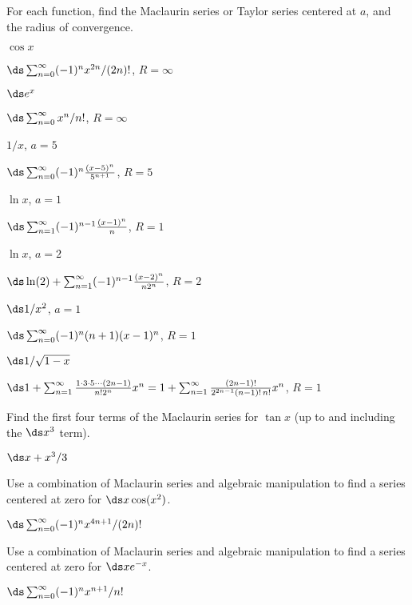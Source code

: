 \begin{exercises}

For each function, find the Maclaurin series or Taylor series centered
at $a$, and the radius of convergence.

\exercise $\cos x$
\begin{answer} $\ds\sum_{n=0}^\infty (-1)^n x^{2n}/(2n)!$, $R=\infty$
\end{answer}

\exercise $\ds e^x$
\begin{answer} $\ds\sum_{n=0}^\infty x^n/n!$, $R=\infty$
\end{answer}

\exercise $1/x$, $a=5$
\begin{answer} $\ds\sum_{n=0}^\infty (-1)^n{(x-5)^n\over 5^{n+1}}$, $R=5$
\end{answer}

\exercise $\ln x$, $a=1$
\begin{answer} $\ds\sum_{n=1}^\infty (-1)^{n-1}{(x-1)^n\over n}$, $R=1$
\end{answer}

\exercise $\ln x$, $a=2$
\begin{answer} $\ds\ln(2)+\sum_{n=1}^\infty (-1)^{n-1}{(x-2)^n\over n 2^n}$, $R=2$
\end{answer}

\exercise $\ds 1/x^2$, $a=1$
\begin{answer} $\ds\sum_{n=0}^\infty (-1)^n(n+1)(x-1)^n$, $R=1$
\end{answer}

\exercise $\ds 1/\sqrt{1-x}$
\begin{answer} $\ds1+\sum_{n=1}^\infty {1\cdot3\cdot5\cdots(2n-1)\over
n!2^n} x^n=1+\sum_{n=1}^\infty {(2n-1)!\over 2^{2n-1}(n-1)!\,n!}x^n$, $R=1$
\end{answer}

\exercise Find the first four terms of the Maclaurin series for $\tan
x$ (up to and including the $\ds x^3$ term).
\begin{answer} $\ds x+x^3/3$
\end{answer}

\exercise Use a combination of Maclaurin series and algebraic
manipulation to find a series centered at zero for
$\ds x\cos (x^2)$.
\begin{answer} $\ds\sum_{n=0}^\infty (-1)^n x^{4n+1}/(2n)!$
\end{answer}

\exercise Use a combination of Maclaurin series and algebraic
manipulation to find a series centered at zero for
$\ds xe^{-x}$.
\begin{answer} $\ds\sum_{n=0}^\infty (-1)^n x^{n+1}/n!$
\end{answer}

\end{exercises}

